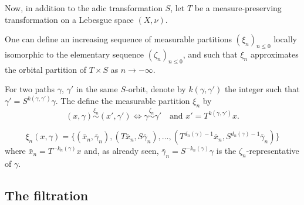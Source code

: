 \documentclass[12pt,a4paper]{article}
\begin{document}
Now, in addition to the adic transformation $S$, let $T$ be a measure-preserving transformation on a Lebesgue space $(X, \nu)$. 

One can define an increasing sequence of measurable partitions ${(\xi_n)}_{n \leq 0}$ 
locally isomorphic to the elementary sequence ${(\zeta_n)}_{n \leq 0}$,  
and such that $\xi_n$ approximates the orbital partition of $T \times S$ as 
$n \to -\infty$.

For two paths $\gamma$, $\gamma'$ in the same $S$-orbit, denote by $k(\gamma,\gamma')$ 
the integer such that $\gamma'=S^{k(\gamma,\gamma')}\gamma$. 
The define the measurable partition $\xi_n$ by 
$$
(x, \gamma) \overset{\xi_n}{\sim} (x', \gamma') \iff 
\gamma \overset{\zeta_n}{\sim} \gamma' \quad 
\text{and $x'=T^{k(\gamma,\gamma')}x$}. 
$$

$$
\xi_n(x,\gamma) = \bigl\{(\bar x_n, \bar\gamma_n), (T\bar x_n, S\bar\gamma_n), 
\ldots, (T^{d_n(\gamma)-1}\bar x_n, S^{d_n(\gamma)-1}\bar\gamma_n) \bigr\}
$$
where $\bar x_n = T^{-k_n(\gamma)}x$ and, as already seen, 
$\bar\gamma_n = S^{-k_n(\gamma)}\gamma$ is the $\zeta_n$-representative of 
$\gamma$. 


\subsection{The filtration} 
\end{document}
